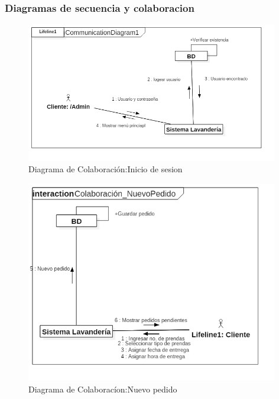 \newpage

\subsubsection{Diagramas de secuencia y colaboracion}

\begin{figure}[htb]
\begin{center}
\includegraphics[width=11cm]{./imagenes/diagramas/Colaboracion_IniciarSesion.png}
\end{center}
\caption{Diagrama de Colaboración:Inicio de sesion}
\end{figure}


\begin{figure}[htb]
\begin{center}
\includegraphics[width=11cm]{./imagenes/diagramas/Colaboracion_NuevoPedido.png}
\end{center}
\caption{Diagrama de Colaboracíon:Nuevo pedido}
\end{figure}


